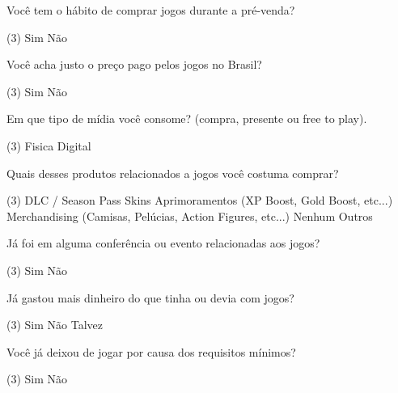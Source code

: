 \documentclass[11pt,a4paper]{article}
\begin{document}
\begin{question}
	Você tem o hábito de comprar jogos durante a pré-venda?
	\begin{tasks}(3)
	\task Sim
	\task Não
	\end{tasks}
\end{question}
\begin{question}
	Você acha justo o preço pago pelos jogos no Brasil?
	\begin{tasks}(3)
	\task Sim
	\task Não
	\end{tasks}
\end{question}
\begin{question}
	Em que tipo de mídia você consome? (compra, presente ou free to play).
	\begin{tasks}(3)
	\task Fisica
	\task Digital
	\end{tasks}
\end{question}
\begin{question}
	Quais desses produtos relacionados a jogos você costuma comprar?
	\begin{tasks}(3)
	\task DLC / Season Pass
	\task Skins
	\task Aprimoramentos (XP Boost, Gold Boost, etc...)
	\task Merchandising (Camisas, Pelúcias, Action Figures, etc...)
	\task Nenhum
	\task Outros
	\end{tasks}
\end{question}
\begin{question}
 Já foi em alguma conferência ou evento relacionadas aos jogos?
	\begin{tasks}(3)
	\task Sim
	\task Não
	\end{tasks}
\end{question}

\begin{question}
	Já gastou mais dinheiro do que tinha ou devia com jogos?
	\begin{tasks}(3)
	\task Sim
	\task Não 
	\task Talvez
	\end{tasks}
\end{question}

\begin{question}
	Você já deixou de jogar por causa dos requisitos mínimos?
	\begin{tasks}(3)
	\task Sim
	\task Não
	\end{tasks}
\end{question}
\end{document}
